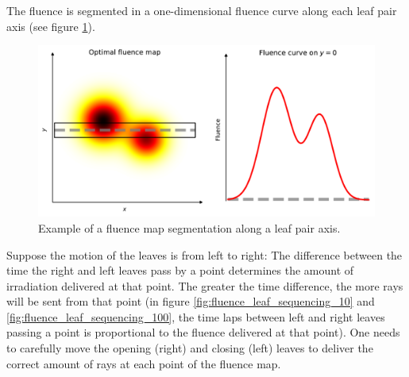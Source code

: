The fluence is segmented in a one-dimensional fluence curve along each leaf pair axis (see figure \ref{fig:fluence_curve}).
\begin{figure}
	\centering
	\includegraphics[width=12cm]{_fluence_curve.pdf}
	\caption{Example of a fluence map segmentation along a leaf pair axis.}
	\label{fig:fluence_curve}
\end{figure}
Suppose the motion of the leaves is from left to right:
The difference between the time the right and left leaves pass by a point determines the amount of irradiation delivered at that point.
The greater the time difference, the more rays will be sent from that point (in figure \ref{fig:fluence_leaf_sequencing_10} and \ref{fig:fluence_leaf_sequencing_100}, the time laps between left and right leaves passing a point is proportional to the fluence delivered at that point).
One needs to carefully move the opening (right) and closing (left) leaves to deliver the correct amount of rays at each point of the fluence map.
